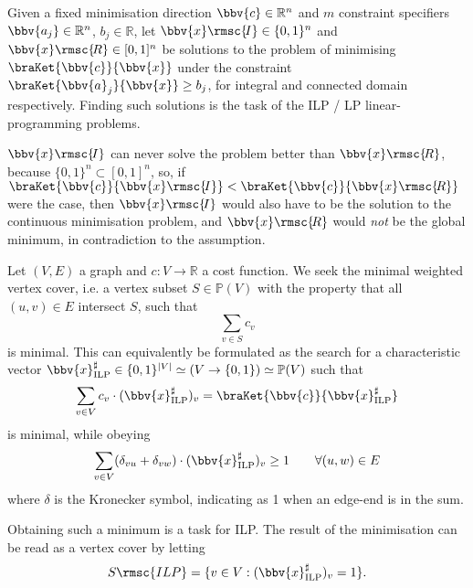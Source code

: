 



\newcommand{\xIntgMin}{\bbv{x}\rmsc{\!I}}
\newcommand{\xRealMin}{\bbv{x}\rmsc{\!R}}
Given a fixed minimisation direction $\bbv{c}\in\mathbb{R}^n$ and
$m$ constraint specifiers $\bbv{a_j}\in\mathbb{R}^n$, $b_j\in\mathbb{R}$,
let $\xIntgMin\in\{0,1\}^n$ and $\xRealMin\in[0,1]^n$ be solutions to
the problem of minimising $\braKet{\bbv{c}}{\bbv{x}}$ under the constraint
$\braKet{\bbv{a}_j}{\bbv{x}}\geq b_j$, for integral and connected domain respectively.
Finding such solutions is the task of the ILP / LP linear-programming problems.

\subex{}\label{continuousrules}
$\xIntgMin$ can never solve the problem better than $\xRealMin$,
because $\{0,1\}^n \subset [0,1]^n$, so, if
$\braKet{\bbv{c}}{\xIntgMin} < \braKet{\bbv{c}}{\xRealMin}$ were the
case, then $\xIntgMin$ would also have to be the solution to the 
continuous minimisation problem, and $\xRealMin$ would \emph{not} be
the global minimum, in contradiction to the assumption.

\subex{}

Let $(V,E)$ a graph and $c\colon V \to \mathbb{R}$ a cost function. We seek the
minimal weighted vertex cover, i.e. a vertex subset $S \in \mathbb{P}(V)$ with the
property that all $(u,v)\in E$ intersect $S$, such that
\[
  \sum_{v\in S}c_v
\]
\newcommand{\xSharpI}{\bbv{x}^{\sharp}_{\mathrm{ILP}}}
\newcommand{\xSharp}{\bbv{x}^{\sharp}_{\mathrm{LP}}}
is minimal. This can equivalently be formulated as the search for a characteristic
vector $\xSharpI \in \{0,1\}^{|V|} \simeq (V\to \{0,1\}) \simeq \mathbb{P}(V)$ such that
\[
  \sum_{v\in V}c_v \cdot (\xSharpI)_v
    = \braKet{\bbv{c}}{\xSharpI}
\]
is minimal, while obeying
\[
  \sum_{v\in V} (\delta_{vu} + \delta_{vw})\cdot (\xSharpI)_v \geq 1  \qquad { \forall (u,w)\in E }
\]
where $\delta$ is the Kronecker symbol, indicating as 1 when an edge-end is in the sum.

Obtaining such a minimum is a task for ILP.
The result of the minimisation can be read as a vertex cover by letting
\newcommand{\covI}{S\rmsc{ILP}}
\newcommand{\cov}{S\rmsc{LP}}
\[
  { \covI = \{v\in V : (\xSharpI)_v = 1\} }.
\]

